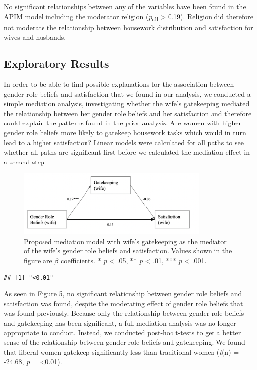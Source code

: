 \documentclass[
  man,floatsintext]{apa6}
\begin{document}
No significant relationships between any of the variables have been found in the APIM model including the moderator religion (\emph{p}\textsubscript{all} \textgreater{} 0.19). Religion did therefore not moderate the relationship between housework distribution and satisfaction for wives and husbands.

\hypertarget{exploratory-results}{%
\subsection{Exploratory Results}\label{exploratory-results}}

In order to be able to find possible explanations for the association between gender role beliefs and satisfaction that we found in our analysis, we conducted a simple mediation analysis, investigating whether the wife's gatekeeping mediated the relationship between her gender role beliefs and her satisfaction and therefore could explain the patterns found in the prior analysis. Are women with higher gender role beliefs more likely to gatekeep housework tasks which would in turn lead to a higher satisfaction?
Linear models were calculated for all paths to see whether all paths are significant first before we calculated the mediation effect in a second step.




\begin{figure}
\includegraphics[width=3.69in]{mediation} \caption{Proposed mediation model with wife's gatekeeping as the mediator of the wife's gender role beliefs and satisfaction. Values shown in the figure are \(\beta\) coefficients.
* \emph{p} \textless{} .05, ** \emph{p} \textless{} .01, *** \emph{p} \textless{} .001.}\label{fig:unnamed-chunk-64}
\end{figure}

\begin{verbatim}
## [1] "<0.01"
\end{verbatim}

As seen in Figure 5, no significant relationship between gender role beliefs and satisfaction was found, despite the moderating effect of gender role beliefs that was found previously. Because only the relationship between gender role beliefs and gatekeeping has been significant, a full mediation analysis was no longer appropriate to conduct.
Instead, we conducted post-hoc t-tests to get a better sense of the relationship between gender role beliefs and gatekeeping. We found that liberal women gatekeep significantly less than traditional women (\emph{t}(n) = -24.68, \emph{p} = \textless0.01).
\end{document}
